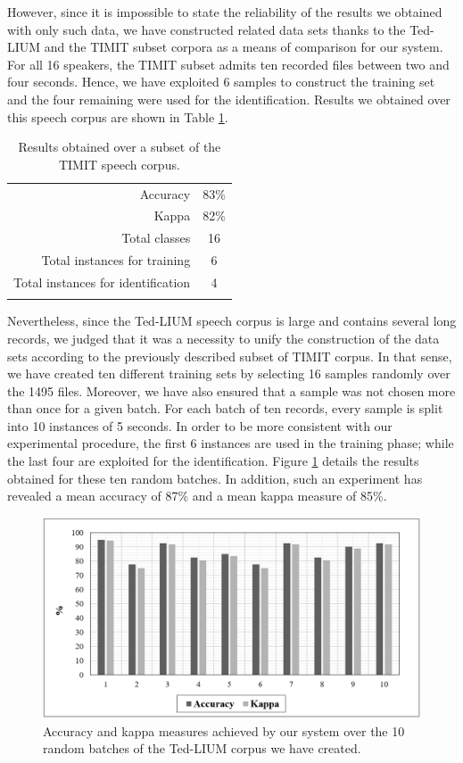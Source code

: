 \documentclass[cryptography,article,submit,moreauthors,pdftex,10pt,a4paper]{mdpi}
\begin{document}
However, since it is impossible to state the reliability of the results we obtained with only such data, we have constructed related data sets thanks to the Ted-LIUM and the TIMIT subset corpora as a means of comparison for our system. 
For all 16 speakers, the TIMIT subset admits ten recorded files between two and four seconds. Hence, we have exploited 6 samples to construct the training set and the four remaining were used for the identification. Results we obtained over this speech corpus are shown in Table \ref{tab:3}.

\begin{table}[H]
\caption{Results obtained over a subset of the TIMIT speech corpus.}
\centering
\label{tab:3}
\begin{tabular}{rc}
	\hline\noalign{\smallskip}
		Accuracy & 83\% \\
		Kappa & 82\% \\
		Total classes & 16\\
		Total instances for training & 6\\
		Total instances for identification & 4\\
	\noalign{\smallskip}\hline
\end{tabular}
\end{table}

Nevertheless, since the Ted-LIUM speech corpus is large and contains several long records, we judged that it was a necessity to unify the construction of the data sets according to the previously described subset of TIMIT corpus. In that sense, we have created ten different training sets by selecting 16 samples randomly over the 1495 files. Moreover, we have also ensured that a sample was not chosen more than once for a given batch. For each batch of ten records, every sample is split into 10 instances of 5 seconds. In order to be more consistent with our experimental procedure, the first 6 instances are used in the training phase; while the last four are exploited for the identification. Figure \ref{fig:9} details the results obtained for these ten random batches. In addition, such an experiment has revealed a mean accuracy of 87\% and a mean kappa measure of 85\%. 

\begin{figure}[H]
	\centering
	\includegraphics[width=10 cm]{9.png}
	\caption{Accuracy and kappa measures achieved by our system over the 10 random batches of the Ted-LIUM corpus we have created.}
	\label{fig:9}
\end{figure}
\end{document}
